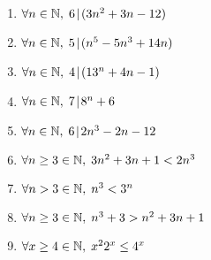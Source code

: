 \begin{enumerate}
\wbvfill

\workbookpagebreak

\item $\forall n \in {\mathbb N}, \; 6 \!\mid\! (3n^{2}+3n-12)$

\wbvfill


\item $\forall n \in {\mathbb N}, \; 5 \!\mid\! (n^{5}-5n^{3}+14n)$

\wbvfill

\workbookpagebreak

\item $\forall n \in {\mathbb N}, \; 4 \!\mid\! (13^{n}+4n-1)$

\wbvfill


\item $\forall n \in {\mathbb N}, \; 7 \!\mid\! 8^n+6$

\wbvfill

\workbookpagebreak

\item $\forall n \in {\mathbb N}, \; 6 \!\mid\! 2n^3 - 2n - 12$

\wbvfill


\item $\forall n \geq 3 \in {\mathbb N}, \; 3n^2+3n+1 < 2n^3$

\wbvfill

\workbookpagebreak

\item $\forall n > 3 \in {\mathbb N}, \; n^3 < 3^n$

\wbvfill


\item $\forall n \geq 3 \in {\mathbb N}, \; n^{3}+3>n^{2}+3n+1$

\wbvfill

\workbookpagebreak

\item $\forall x \geq 4 \in {\mathbb N}, \; x^22^x \leq 4^x$

\wbvfill


\end{enumerate}



